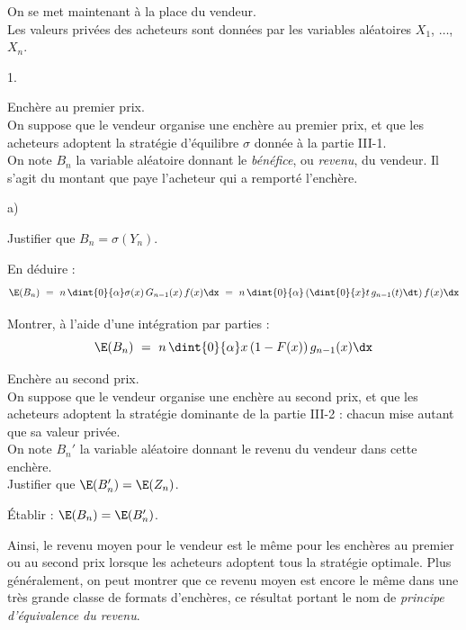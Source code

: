 \noindent
On se met maintenant à la place du vendeur.\\
Les valeurs privées des acheteurs sont données par les variables 
aléatoires $X_1$, $\ldots$, $X_n$.
\begin{noliste}{1.}
  \setlength{\itemsep}{4mm}
  \setcounter{enumi}{12}
  \item Enchère au premier prix.\\
  On suppose que le vendeur organise une enchère au premier prix, et 
  que les acheteurs adoptent la stratégie d'équilibre $\sigma$ donnée
  à la partie III-1.\\
  On note $B_n$ la variable aléatoire donnant le \emph{bénéfice}, ou 
  \emph{revenu}, du vendeur. Il s'agit du montant que paye l'acheteur
  qui a remporté l'enchère.
  \begin{noliste}{a)}
    \setlength{\itemsep}{2mm}
    \item Justifier que $B_n = \sigma(Y_n)$.
    
    
    
    

    
    \item En déduire :
    \[
      \E(B_n) \ = \ n \, \dint{0}{\alpha} \sigma(x) \, G_{n-1}(x) \,
      f(x) \dx \ = \ n \, \dint{0}{\alpha} \left( \dint{0}{x} t \, 
      g_{n-1}(t) \dt \right) f(x) \dx
    \]
    
    

    
    \item Montrer, à l'aide d'une intégration par parties :
    \[
      \E(B_n) \ = \ n \, \dint{0}{\alpha} x \, (1-F(x)) \, 
      g_{n-1}(x) \dx
    \]
    
    
  \end{noliste}
  
  \item Enchère au second prix.\\
  On suppose que le vendeur organise une enchère au second prix, et que 
  les acheteurs adoptent la stratégie dominante de la partie III-2 : 
  chacun mise autant que sa valeur privée.\\
  On note $B_n'$ la variable aléatoire donnant le revenu du vendeur 
  dans cette enchère.\\
  Justifier que $\E(B_n') = \E(Z_n)$.
  
  

  
  \item Établir : $\E(B_n) = \E(B_n')$.
  
  
\end{noliste}
Ainsi, le revenu moyen pour le vendeur est le même pour les enchères au 
premier ou au second prix lorsque les acheteurs adoptent tous la 
stratégie optimale. Plus généralement, on peut montrer que ce revenu 
moyen est encore le même dans une très grande classe de formats 
d'enchères, ce résultat portant le nom de \emph{principe d'équivalence 
du revenu}.






